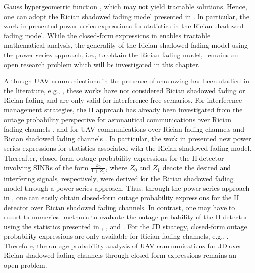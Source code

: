 Gauss hypergeometric function \cite{kumar2015approximate}, which may not yield tractable solutions. \textcolor{black}{Hence}, one can adopt the Rician shadowed fading model presented in \cite{tan2018ricianShad}. In particular, the work in \cite{tan2018ricianShad} presented power series expressions for statistics in the Rician shadowed fading model. While the closed-form expressions in  \cite{tan2018ricianShad} enables tractable mathematical analysis, the generality of the Rician shadowed fading model using the power series approach, i.e., to obtain the Rician fading model, remains an open research problem which will be investigated in this chapter.

Although UAV communications in the presence of shadowing has been studied in the literature, e.g., \cite{motlagh2016uav,al2017modeling,amorim2017radio}, these works have not considered Rician shadowed fading or Rician fading and are only valid for interference-free scenarios. For interference management strategies, the II approach has already been investigated from the outage probability perspective for aeronautical communications over Rician fading channels \cite{ernest2019outage,ernest2018performance}, and for UAV communications over Rician fading channels \cite{ernest2018hybrid} and Rician shadowed fading channels \cite{tan2018ricianShad}. In particular, the work in \cite{tan2018ricianShad} presented new power series expressions for statistics associated with the Rician shadowed fading model. Thereafter, closed-form outage probability expressions for the II detector involving SINRs of the form $\frac{Z_0}{1+Z_1}$, where $Z_0$ and $Z_1$ denote the desired and interfering signals, respectively, were derived for the Rician shadowed fading model through a power series approach. Thus, through the power series approach in \cite{tan2018ricianShad}, one can easily obtain closed-form outage probability expressions for the II detector over Rician shadowed fading channels. In contrast, one may have to resort to numerical methods to evaluate the outage probability of the II detector using the statistics presented in \cite[eq. (3)]{abdi2003new}, \cite[eq. (12)]{chun2017comprehensive}, and \cite[eq. (4)]{paris2014statistical}. For the JD strategy, closed-form outage probability expressions are only available for Rician fading channels, e.g., \cite{tan2018joint}. Therefore, the outage probability analysis of UAV communications for JD over Rician shadowed fading channels through closed-form expressions remains an open problem.

